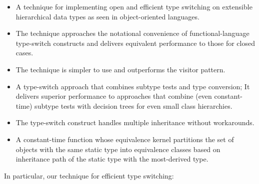   \begin{itemize}
  \setlength{\itemsep}{0pt}
  \setlength{\parskip}{0pt}
  \item A technique for implementing open and efficient type 
        switching on extensible hierarchical data types as seen in 
        object-oriented languages.
  \item The technique approaches the notational convenience of
	functional-language type-switch constructs and delivers equivalent
 	performance to those for closed cases.
  \item The technique is simpler to use and outperforms the visitor pattern.
  \item A type-switch approach that combines subtype tests and type conversion;
      It delivers superior performance to
        approaches that combine (even constant-time) subtype tests with 
decision trees for even small class hierarchies.
  \item The type-switch construct handles multiple inheritance without workarounds.
  \item A constant-time function whose equivalence kernel partitions 
        the set of objects with the same static type into equivalence classes 
        based on inheritance path of the static type with the most-derived type.
  \end{itemize}

\noindent
In particular, our technique for efficient type switching:

